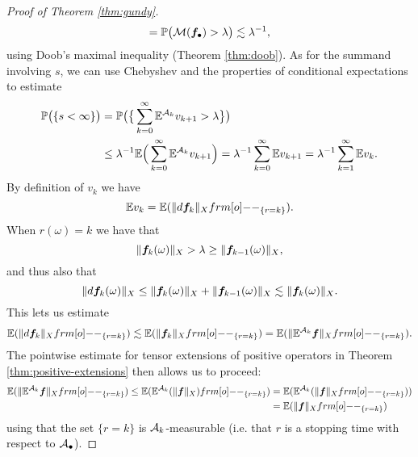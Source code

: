 \begin{proof}[Proof of Theorem \ref{thm:gundy}]
\begin{equation}
    = \mathbb{P}\big( \mathcal{M}(\bm{f}_{\bullet}) > \lambda \big) \lesssim \lambda^{-1},
  \end{equation}
  using Doob's maximal inequality (Theorem \ref{thm:doob}).
  As for the summand involving $s$, we can use Chebyshev and the properties of conditional expectations to estimate
  \begin{equation*}
    \begin{aligned}
      \mathbb{P}\big(\{s < \infty\}\big)
      &= \mathbb{P}\big( \big\{ \sum_{k=0}^{\infty} \mathbb{E}^{\mathcal{A}_{k}} v_{k+1} > \lambda \big\} \big) \\
      &\leq \lambda^{-1} \mathbb{E}\Big( \sum_{k=0}^{\infty} \mathbb{E}^{\mathcal{A}_{k}} v_{k+1} \Big)
      = \lambda^{-1} \sum_{k=0}^{\infty} \mathbb{E} v_{k+1}
      = \lambda^{-1} \sum_{k=1}^{\infty} \mathbb{E} v_{k}.
    \end{aligned}
  \end{equation*}
  By definition of $v_{k}$ we have
  \begin{equation*}
    \E v_{k} = \E ( \|d\mb{f}_{k}\|_{X} \1_{\{r = k\}} ).
  \end{equation*}
  When $r(\omega) = k$ we have that
  \begin{equation*}
    \|\bm{f}_{k}(\omega)\|_{X} > \lambda \geq \|\bm{f}_{k-1}(\omega)\|_{X},
  \end{equation*}
  and thus also that
  \begin{equation*}
    \|d\bm{f}_{k}(\omega)\|_{X} \leq \|\bm{f}_{k}(\omega)\|_{X} + \|\bm{f}_{k-1}(\omega)\|_{X} \lesssim \|\bm{f}_{k}(\omega)\|_{X}.
  \end{equation*}
  This lets us estimate
  \begin{equation*}
    \E ( \|d\mb{f}_{k}\|_{X} \1_{\{r = k\}} )
    \lesssim \E ( \|\mb{f}_{k}\|_{X} \1_{\{r = k\}} )
    = \E ( \|\E^{\mc{A}_{k}} \mb{f}\|_{X} \1_{\{r = k\}} ).
  \end{equation*}
  The pointwise estimate for tensor extensions of positive operators in Theorem \ref{thm:positive-extensions} then allows us to proceed:
  \begin{equation*}
    \begin{aligned}
    \E ( \|\E^{\mc{A}_{k}} \mb{f}\|_{X} \1_{\{r = k\}} )
    \leq \E ( \E^{\mc{A}_{k}}(\|\mb{f}\|_{X}) \1_{\{r = k\}} )
    &= \E ( \E^{\mc{A}_{k}}(\|\mb{f}\|_{X} \1_{\{r = k\}}) ) \\
    &= \E (\|\mb{f}\|_{X} \1_{\{r = k\}})
  \end{aligned}
  \end{equation*}
  using that the set $\{r = k\}$ is $\mathcal{A}_{k}$-measurable (i.e. that $r$ is a stopping time with respect to $\mathcal{A}_{\bullet}$).

\end{proof}
